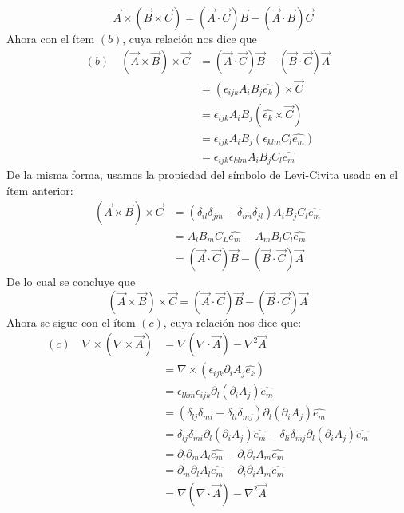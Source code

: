 \documentclass[11pt,letterpaper]{article}
\begin{document}
\begin{equation}
    \quad \vec{A}\times (\vec{B}\times\vec{C})  = (\vec{A}\cdot \vec{C}) \vec{B} - (\vec{A}\cdot\vec{B})\vec{C}
\end{equation}
Ahora con el ítem $(b)$, cuya relación nos dice que
\begin{align*}
    (b) \quad (\vec{A}\times\vec{B}) \times \vec{C}   & = (\vec{A}\cdot \vec{C})\vec{B} - (\vec{B}\cdot\vec{C}) \vec{A} \\ & = (\epsilon_{ijk}A_iB_j\hat{e_k})\times \vec{C} \\
    & = \epsilon_{ijk}A_iB_j (\hat{e_k}\times\vec{C}) \\
    & = \epsilon_{ijk}A_iB_j (\epsilon_{klm}C_l\hat{e_m}) \\
    & = \epsilon_{ijk}\epsilon_{klm}A_iB_jC_l\hat{e_m}
\end{align*}
De la misma forma, usamos la propiedad del símbolo de Levi-Civita usado en el ítem anterior: 
\begin{align*}
    (\vec{A}\times\vec{B}) \times \vec{C}   & = (\delta_{il}\delta_{jm} - \delta_{im}\delta_{jl}) A_iB_jC_l\hat{e_m} \\
    & = A_lB_mC_L \hat{e_m} - A_mB_lC_l \hat{e_m} \\
    & = (\vec{A}\cdot\vec{C})\vec{B} - (\vec{B}\cdot\vec{C})\vec{A}
\end{align*}
De lo cual se concluye que
\begin{equation}
   (\vec{A}\times\vec{B}) \times \vec{C} = (\vec{A}\cdot\vec{C})\vec{B} - (\vec{B}\cdot\vec{C})\vec{A}
\end{equation}
Ahora se sigue con el ítem $(c)$, cuya relación nos dice que:
\begin{align*}
    (c) \quad \nabla \times (\nabla \times \vec{A}) & = \nabla (\nabla \cdot \vec{A}) - \nabla^2 \vec{A} \\
    & = \nabla \times (\epsilon_{ijk}\partial_iA_j\hat{e_k}) \\
    & = \epsilon_{lkm} \epsilon_{ijk} \partial_l (\partial_i A_j) \hat{e_m} \\
    & = (\delta_{lj}\delta_{mi}  - \delta_{li}\delta_{mj})\partial_l (\partial_i A_j) \hat{e_m} \\
    & =   \delta_{lj}\delta_{mi} \partial_l (\partial_i A_j )\hat{e_m}-\delta_{li}\delta_{mj}\partial_l (\partial_i A_j) \hat{e_m} \\
    & =   \partial_l \partial_m A_l \hat{e_m} -\partial_i\partial_i A_m \hat{e_m} \\
    & =   \partial_m \partial_l A_l \hat{e_m}-\partial_i\partial_i A_m \hat{e_m} \\
    & = \nabla (\nabla \cdot \vec{A}) - \nabla^2\vec{A} 
\end{align*}
\end{document}
